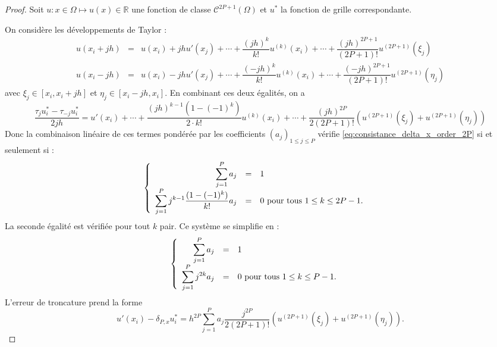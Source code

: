 \begin{proof}
Soit $u : x \in \Omega \mapsto u(x) \in \mathbb{R}$ une fonction de classe $\mathcal{C}^{2P+1}( \Omega)$ et $u^*$ la fonction de grille correspondante.

On considère les développements de Taylor :
\begin{equation}
\begin{array}{rcl}
u(x_i + jh) & = & u(x_i) + j h u'(x_j) + \cdots + \dfrac{(jh)^k}{k!}u^{(k)}(x_i) + \cdots +\dfrac{(jh)^{2P+1}}{(2P+1)!} u^{(2P+1)}(\xi_j)\\
u(x_i - jh) & = & u(x_i) - j h u'(x_j) + \cdots + \dfrac{(-jh)^k}{k!}u^{(k)}(x_i) + \cdots +\dfrac{(-jh)^{2P+1}}{(2P+1)!} u^{(2P+1)}(\eta_j)
\end{array}
\end{equation}
avec $\xi_j \in [x_i, x_i+jh]$ et $\eta_j \in [x_i-jh, x_i]$. En combinant ces deux égalités, on a
\begin{equation}
\dfrac{\tau_ju^*_i - \tau_{-j} u^*_i}{2jh} = u'(x_i) + \cdots + \dfrac{(jh)^{k-1}(1 - (-1)^k)}{2 \cdot k!} u^{(k)}(x_i) + \cdots +\dfrac{(jh)^{2P}}{2(2P+1)!} \left( u^{(2P+1)}(\xi_j) + u^{(2P+1)}(\eta_j) \right)
\end{equation}
Donc la combinaison linéaire de ces termes pondérée par les coefficients $(a_j)_{1 \leq j \leq P}$ vérifie \eqref{eq:consistance_delta_x_order_2P} si et seulement si :
\begin{equation}
\left\lbrace
\begin{array}{rcll}
\displaystyle\sum\limits_{j=1}^P a_j & = & 1 & \\
\displaystyle\sum\limits_{j=1}^P j^{k-1} \dfrac{(1 - (-1)^k)}{k!} a_j & = & 0 \text{ pour tous } 1 \leq k \leq 2P-1.
\end{array}
\right.
\end{equation}
La seconde égalité est vérifiée pour tout $k$ pair. Ce système se simplifie en :
\begin{equation}
\left\lbrace
\begin{array}{rcll}
\displaystyle\sum\limits_{j=1}^P a_j & = & 1 & \\
\displaystyle\sum\limits_{j=1}^P j^{2k} a_j & = & 0 \text{ pour tous } 1 \leq k \leq P-1.
\end{array}
\right.
\end{equation}
L'erreur de troncature prend la forme
\begin{equation}
u'(x_i) - \delta_{P,x} u^*_i = h^{2P} \sum_{j=1}^P a_j \dfrac{j^{2P}}{2(2P+1)!} \left( u^{(2P+1)}(\xi_j) + u^{(2P+1)}(\eta_j) \right).
\end{equation}
\end{proof}

